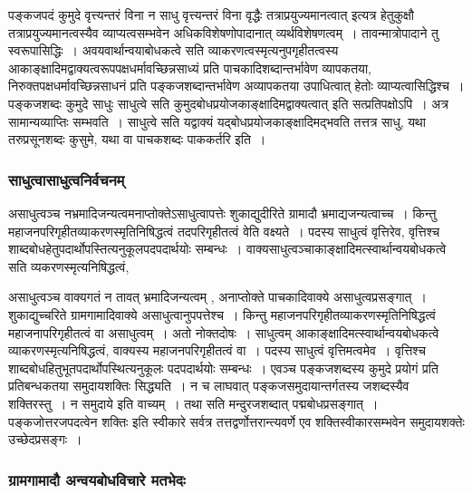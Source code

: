 				पङ्कजपदं कुमुदे वृत्त्यन्तरं विना न साधु वृत्त्यन्तरं विना वृद्धैः तत्राप्रयुज्यमानत्वात् इत्यत्र हेतुकुक्षौ तत्राप्रयुज्यमानत्वस्यैव व्याप्यत्वसम्भवेन अधिकविशेषणोपादानात् व्यर्थविशेषणत्वम्~। तावन्मात्रोपादाने तु स्वरूपासिद्धिः~। अवयवार्थान्वयाबोधकत्वे सति व्याकरणत्वस्मृत्यनुपगृहीतत्वस्य आकाङ्क्षादिमद्वाक्यत्वरूपपक्षधर्मावच्छिन्नसाध्यं प्रति पाचकादिशब्दान्तर्भावेण व्यापकतया, निरुक्तपक्षधर्मावच्छिन्नसाधनं प्रति पङ्कजशब्दान्तर्भावेण अव्यापकतया उपाधित्वात् हेतोः व्याप्यत्वासिद्धिश्च~। पङ्कजशब्दः कुमुदे साधुः साधुत्वे सति कुमुदबोधप्रयोजकाङ्क्षादिमद्वाक्यत्वात् इति सत्प्रतिपक्षोऽपि~। अत्र सामान्यव्याप्तिः सम्भवति~। साधुत्वे सति यद्वाक्यं यद्बोधप्रयोजकाङ्क्षादिमद्भवति तत्तत्र साधु, यथा तरुप्रसूनशब्दः कुसुमे, यथा वा पाचकशब्दः पाककर्तरि इति~।
			
			\subsubsection{साधुत्वासाधुत्वनिर्वचनम्}
			
				\begin{small}
			
					असाधुत्वञ्च  नभ्रमादिजन्यत्वमनाप्तोक्तेऽसाधुत्वापत्तेः शुकाद्युदीरिते ग्रामादौ भ्रमाद्यजन्यत्वाच्च~। किन्तु महाजनपरिगृहीतव्याकरणस्मृतिनिषिद्धत्वं तदपरिगृहीतत्वं वेति वक्ष्यते~। पदस्य साधुत्वं वृत्तिरेव, वृत्तिश्च शाब्दबोधहेतुपदार्थोपस्तित्यनुकूलपदपदार्थयोः सम्बन्धः~। वाक्यसाधुत्वञ्चाकाङ्क्षादिमत्स्वार्थान्वयबोधकत्वे सति व्यकरणस्मृत्यनिषिद्धत्वं, 
				\end{small}
			
				असाधुत्वञ्च वाक्यगतं न तावत् भ्रमादिजन्यत्वम् , अनाप्तोक्ते पाचकादिवाक्ये असाधुत्वप्रसङ्गात्~। शुकाद्युच्चरिते ग्रामगामादिवाक्ये असाधुत्वानुपपत्तेश्च~। किन्तु महाजनपरिगृहीतव्याकरणस्मृतिनिषिद्धत्वं महाजनापरिगृहीतत्वं वा असाधुत्वम्~। अतो नोक्तदोषः~। साधुत्वम् आकाङ्क्षादिमत्स्वार्थान्वयबोधकत्वे व्याकरणस्मृत्यनिषिद्धत्वं, वाक्यस्य महाजनपरिगृहीतत्वं वा~। पदस्य साधुत्वं वृत्तिमत्वमेव~। वृत्तिश्च शाब्दबोधहितुभूतपदार्थोपस्थित्यनुकूलः पदपदार्थयोः सम्बन्धः~। एवञ्च पङ्कजशब्दस्य कुमुदे प्रयोगं प्रति प्रतिबन्धकतया समुदायशक्तिः सिद्ध्यति~। न च लाघवात् पङ्कजसमुदायान्तर्गतस्य जशब्दस्यैव शक्तिरस्तु~। न समुदाये इति वाच्यम्~। तथा सति मन्दुरजशब्दात् पद्मबोधप्रसङ्गात्~। पङ्कजोत्तरजपदत्वेन शक्तिः इति स्वीकारे सर्वत्र तत्तद्वर्णोत्तरान्त्यवर्णे एव शक्तिस्वीकारसम्भवेन समुदायशक्तेः उच्छेदप्रसङ्गः~। 
			
			\subsubsection{ग्रामगामादौ अन्वयबोधविचारे मतभेदः}
			
